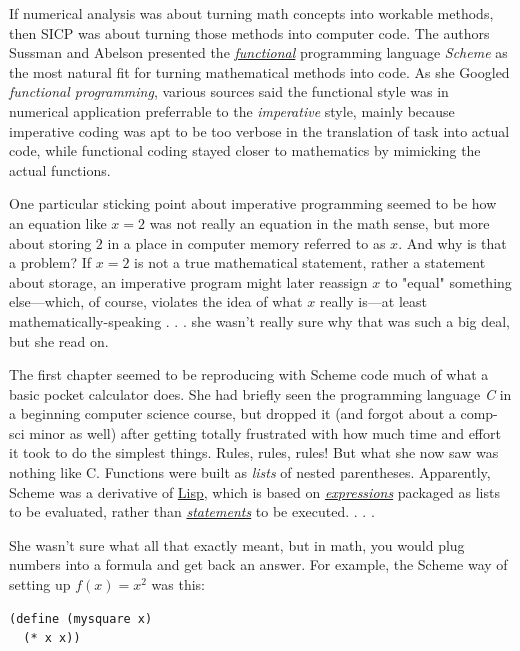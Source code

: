 \documentclass[koma]{article}
\begin{document}
If numerical analysis was about turning math concepts into workable methods, then SICP was about turning those methods into computer code. The authors Sussman and Abelson presented the \emph{\href{https://en.wikipedia.org/wiki/Functional_programming}{functional}} programming language \emph{Scheme} as the most natural fit for turning mathematical methods into code. As she Googled \emph{functional programming}, various sources said the functional style was in numerical application preferrable to the \emph{imperative} style, mainly because imperative coding was apt to be too verbose in the translation of task into actual code, while functional coding stayed closer to mathematics by mimicking the actual functions.

One particular sticking point about imperative programming seemed to be how an equation like \(x = 2\) was not really an equation in the math sense, but more about storing \(2\) in a place in computer memory referred to as \(x\). And why is that a problem? If \(x = 2\) is not a true mathematical statement, rather a statement about storage, an imperative program might later reassign \(x\) to "equal" something else---which, of course, violates the idea of what \(x\) really is---at least mathematically-speaking . . . she wasn't really sure why that was such a big deal, but she read on.

The first chapter seemed to be reproducing with Scheme code much of what a basic pocket calculator does. She had briefly seen the programming language \emph{C} in a beginning computer science course, but dropped it (and forgot about a comp-sci minor as well) after getting totally frustrated with how much time and effort it took to do the simplest things. Rules, rules, rules! But what she now saw was nothing like C. Functions were built as \emph{lists} of nested parentheses. Apparently, Scheme was a derivative of \href{https://en.wikipedia.org/wiki/Lisp_(programming_language)}{Lisp}, which is based on \emph{\href{https://en.wikipedia.org/wiki/Expression_(computer_science)}{expressions}} packaged as lists to be evaluated, rather than \emph{\href{https://en.wikipedia.org/wiki/Statement_(computer_science)}{statements}} to be executed. . . .

She wasn't sure what all that exactly meant, but in math, you would plug numbers into a formula and get back an answer. For example, the Scheme way of setting up \(f(x) = x^2\) was this:

\begin{verbatim}
(define (mysquare x)
  (* x x))
\end{verbatim}
\end{document}

